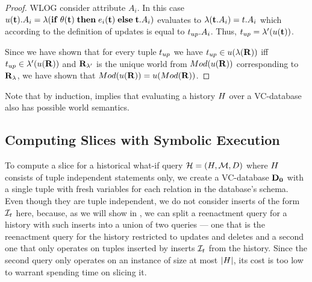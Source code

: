 {\begin{proof}
WLOG consider attribute $A_i$. In this case $u(\mathbf{t}).A_i = \lambda(\mathbf{if}\thickspace \theta(\mathbf{t}) \thickspace \mathbf{then} \thickspace e_i(\mathbf{t}) \thickspace \mathbf{else} \thickspace \mathbf{t}.A_i)$ evaluates to $\lambda(\mathbf{t}.A_i) = t.A_i$ which according to the definition of updates is equal to $t_{up}.A_i$. Thus, $t_{up} = \lambda'(u(\mathbf{t}))$.

Since we have shown that for every tuple $t_{up}$ we have $t_{up} \in u(\lambda(\mathbf{R}))$ iff $t_{up} \in \lambda'(u(\mathbf{R}))$ and $\mathbf{R}_{\lambda'}$ is the unique world from $Mod({u(\mathbf{R})})$ corresponding to $\mathbf{R}_{\lambda}$, we have shown that $Mod({u(\mathbf{R})}) = u(Mod({\mathbf{R}}))$.

%




%

%

%

%



%

%

%

%

%
\end{proof}
}

Note that by induction,  implies that evaluating a history $H$ over a  VC-database also has possible world semantics.



\subsection{Computing Slices with Symbolic Execution}\label{sec:symbolic-exe}

To compute a slice for a historical what-if query $\mathcal{H} = (H, \mathcal{M}, D)$  %
where $H$ consists of tuple independent statements only,
we create a VC-database $\mathbf{D_0}$ with a single tuple with fresh variables for each relation in the database's schema.
Even though they are tuple independent, we do not consider inserts of the form $\mathcal{I}_{t}$ here, because, as we will show in , we can split a reenactment query for a history with such inserts into a union of two queries --- one that is the reenactment query for the history restricted to updates and deletes and a second one that only operates on tuples inserted by inserts $\mathcal{I}_{t}$ from the history. Since the second query only operates on an instance of size at most $\left|{H}\right|$, its cost is too low to warrant spending time on slicing it.

